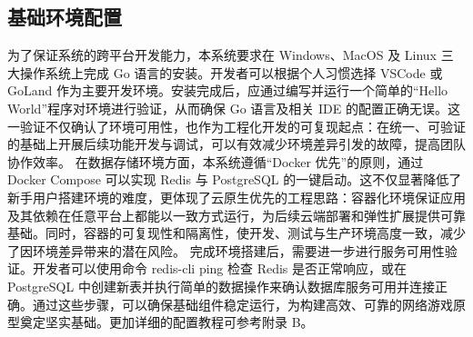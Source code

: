 \subsection{基础环境配置}



为了保证系统的跨平台开发能力，本系统要求在 Windows、MacOS 及 Linux 三大操作系统上完成 Go 语言的安装。开发者可以根据个人习惯选择 VSCode 或 GoLand 作为主要开发环境。安装完成后，应通过编写并运行一个简单的“Hello World”程序对环境进行验证，从而确保 Go 语言及相关 IDE 的配置正确无误。这一验证不仅确认了环境可用性，也作为工程化开发的可复现起点：在统一、可验证的基础上开展后续功能开发与调试，可以有效减少环境差异引发的故障，提高团队协作效率。
在数据存储环境方面，本系统遵循“Docker 优先”的原则，通过 Docker Compose 可以实现 Redis 与 PostgreSQL 的一键启动。这不仅显著降低了新手用户搭建环境的难度，更体现了云原生优先的工程思路：容器化环境保证应用及其依赖在任意平台上都能以一致方式运行，为后续云端部署和弹性扩展提供可靠基础。同时，容器的可复现性和隔离性，使开发、测试与生产环境高度一致，减少了因环境差异带来的潜在风险。
完成环境搭建后，需要进一步进行服务可用性验证。开发者可以使用命令 redis-cli ping 检查 Redis 是否正常响应，或在 PostgreSQL 中创建新表并执行简单的数据操作来确认数据库服务可用并连接正确。通过这些步骤，可以确保基础组件稳定运行，为构建高效、可靠的网络游戏原型奠定坚实基础。更加详细的配置教程可参考附录 B。

